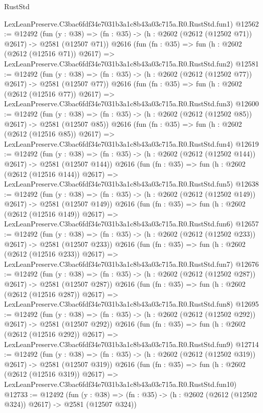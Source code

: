 \begin{lexlean}{RustStd}
\begin{coremodule}
    LexLeanPreserve.C3bac6fdf34e7031b3a1c8b43a03c715a.R0.RustStd.fun1)
@12562 := @12492
    (fun (y : @38) => (fn : @35) -> (h : @2602 (@2612 (@12502 @71)) @2617) -> @2581 (@12507 @71))
    @2616
    (fun (fn : @35) =>
    fun (h : @2602 (@2612 (@12516 @71)) @2617) =>
    LexLeanPreserve.C3bac6fdf34e7031b3a1c8b43a03c715a.R0.RustStd.fun2)
@12581 := @12492
    (fun (y : @38) => (fn : @35) -> (h : @2602 (@2612 (@12502 @77)) @2617) -> @2581 (@12507 @77))
    @2616
    (fun (fn : @35) =>
    fun (h : @2602 (@2612 (@12516 @77)) @2617) =>
    LexLeanPreserve.C3bac6fdf34e7031b3a1c8b43a03c715a.R0.RustStd.fun3)
@12600 := @12492
    (fun (y : @38) => (fn : @35) -> (h : @2602 (@2612 (@12502 @85)) @2617) -> @2581 (@12507 @85))
    @2616
    (fun (fn : @35) =>
    fun (h : @2602 (@2612 (@12516 @85)) @2617) =>
    LexLeanPreserve.C3bac6fdf34e7031b3a1c8b43a03c715a.R0.RustStd.fun4)
@12619 := @12492
    (fun (y : @38) => (fn : @35) -> (h : @2602 (@2612 (@12502 @144)) @2617) -> @2581 (@12507 @144))
    @2616
    (fun (fn : @35) =>
    fun (h : @2602 (@2612 (@12516 @144)) @2617) =>
    LexLeanPreserve.C3bac6fdf34e7031b3a1c8b43a03c715a.R0.RustStd.fun5)
@12638 := @12492
    (fun (y : @38) => (fn : @35) -> (h : @2602 (@2612 (@12502 @149)) @2617) -> @2581 (@12507 @149))
    @2616
    (fun (fn : @35) =>
    fun (h : @2602 (@2612 (@12516 @149)) @2617) =>
    LexLeanPreserve.C3bac6fdf34e7031b3a1c8b43a03c715a.R0.RustStd.fun6)
@12657 := @12492
    (fun (y : @38) => (fn : @35) -> (h : @2602 (@2612 (@12502 @233)) @2617) -> @2581 (@12507 @233))
    @2616
    (fun (fn : @35) =>
    fun (h : @2602 (@2612 (@12516 @233)) @2617) =>
    LexLeanPreserve.C3bac6fdf34e7031b3a1c8b43a03c715a.R0.RustStd.fun7)
@12676 := @12492
    (fun (y : @38) => (fn : @35) -> (h : @2602 (@2612 (@12502 @287)) @2617) -> @2581 (@12507 @287))
    @2616
    (fun (fn : @35) =>
    fun (h : @2602 (@2612 (@12516 @287)) @2617) =>
    LexLeanPreserve.C3bac6fdf34e7031b3a1c8b43a03c715a.R0.RustStd.fun8)
@12695 := @12492
    (fun (y : @38) => (fn : @35) -> (h : @2602 (@2612 (@12502 @292)) @2617) -> @2581 (@12507 @292))
    @2616
    (fun (fn : @35) =>
    fun (h : @2602 (@2612 (@12516 @292)) @2617) =>
    LexLeanPreserve.C3bac6fdf34e7031b3a1c8b43a03c715a.R0.RustStd.fun9)
@12714 := @12492
    (fun (y : @38) => (fn : @35) -> (h : @2602 (@2612 (@12502 @319)) @2617) -> @2581 (@12507 @319))
    @2616
    (fun (fn : @35) =>
    fun (h : @2602 (@2612 (@12516 @319)) @2617) =>
    LexLeanPreserve.C3bac6fdf34e7031b3a1c8b43a03c715a.R0.RustStd.fun10)
@12733 := @12492
    (fun (y : @38) => (fn : @35) -> (h : @2602 (@2612 (@12502 @324)) @2617) -> @2581 (@12507 @324))

\end{coremodule}
\end{lexlean}
